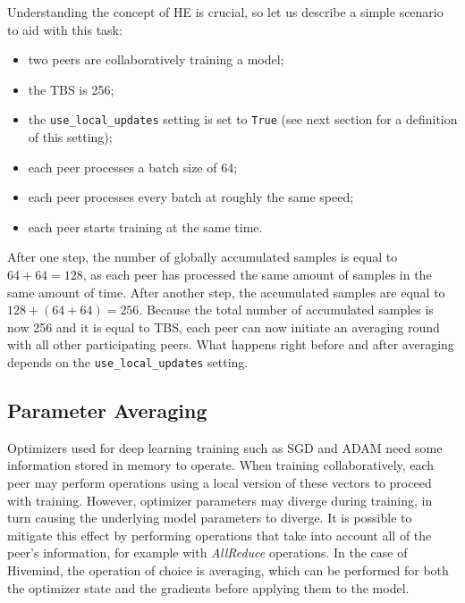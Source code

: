 Understanding the concept of HE is crucial, so let us describe a simple scenario to aid with this task:
\begin{itemize}
    \item two peers are collaboratively training a model;
    \item the TBS is 256;
    \item the \texttt{use\_local\_updates} setting is set to \texttt{True} (see next section for a definition of this setting);
    \item each peer processes a batch size of 64;
    \item each peer processes every batch at roughly the same speed;
    \item each peer starts training at the same time.
\end{itemize}
After one step, the number of globally accumulated samples is equal to $64+64=128$, as each peer has processed the same amount of samples in the same amount of time.
After another step, the accumulated samples are equal to $128+(64+64)=256$.
Because the total number of accumulated samples is now 256 and it is equal to TBS, each peer can now initiate an averaging round with all other participating peers.
What happens right before and after averaging depends on the \texttt{use\_local\_updates} setting.

\subsection{Parameter Averaging}

Optimizers used for deep learning training such as SGD \cite{10.1214/aoms/1177729392} and ADAM \cite{10.48550/arxiv.1412.6980} need some information stored in memory to operate.
When training collaboratively, each peer may perform operations using a local version of these vectors to proceed with training.
However, optimizer parameters may diverge during training, in turn causing the underlying model parameters to diverge.
It is possible to mitigate this effect by performing operations that take into account all of the peer's information, for example with \textit{AllReduce} operations.
In the case of Hivemind, the operation of choice is averaging, which can be performed for both the optimizer state and the gradients before applying them to the model.

